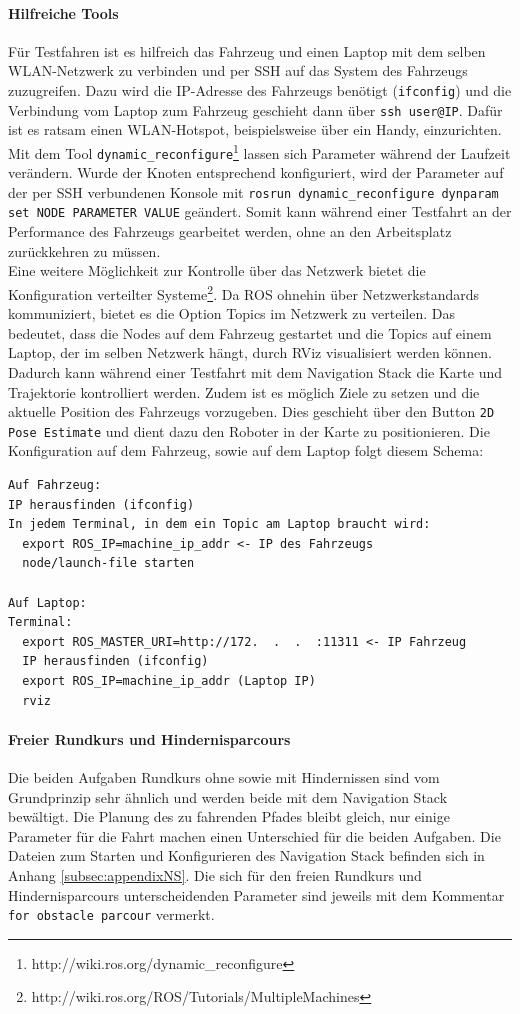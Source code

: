 \paragraph{Hilfreiche Tools}
F\"ur Testfahren ist es hilfreich das Fahrzeug und einen Laptop mit dem selben WLAN-Netzwerk zu verbinden und per SSH auf das System des Fahrzeugs zuzugreifen. Dazu wird die IP-Adresse des Fahrzeugs ben\"otigt (\texttt{ifconfig}) und die Verbindung vom Laptop zum Fahrzeug geschieht dann \"uber \texttt{ssh user@IP}. Daf\"ur ist es ratsam einen WLAN-Hotspot, beispielsweise \"uber ein Handy, einzurichten.\\
Mit dem Tool \texttt{dynamic\_reconfigure}\footnote{http://wiki.ros.org/dynamic\_reconfigure} lassen sich Parameter w\"ahrend der Laufzeit ver\"andern. Wurde der Knoten entsprechend konfiguriert, wird der Parameter auf der per SSH verbundenen Konsole mit \texttt{rosrun dynamic\_reconfigure dynparam set NODE PARAMETER VALUE} ge\"andert. Somit kann w\"ahrend einer Testfahrt an der Performance des Fahrzeugs gearbeitet werden, ohne an den Arbeitsplatz zur\"uckkehren zu m\"ussen.\\
Eine weitere M\"oglichkeit zur Kontrolle \"uber das Netzwerk bietet die Konfiguration verteilter Systeme\footnote{http://wiki.ros.org/ROS/Tutorials/MultipleMachines}. Da ROS ohnehin \"uber Netzwerkstandards kommuniziert, bietet es die Option Topics im Netzwerk zu verteilen. Das bedeutet, dass die Nodes auf dem Fahrzeug gestartet und die Topics auf einem Laptop, der im selben Netzwerk h\"angt, durch RViz visualisiert werden k\"onnen. Dadurch kann w\"ahrend einer Testfahrt mit dem Navigation Stack die Karte und Trajektorie kontrolliert werden. Zudem ist es m\"oglich Ziele zu setzen und die aktuelle Position des Fahrzeugs vorzugeben. Dies geschieht \"uber den Button \texttt{2D Pose Estimate} und dient dazu den Roboter in der Karte zu positionieren. Die Konfiguration auf dem Fahrzeug, sowie auf dem Laptop folgt diesem Schema:
\begin{lstlisting}
Auf Fahrzeug: 
IP herausfinden (ifconfig) 
In jedem Terminal, in dem ein Topic am Laptop braucht wird:  
  export ROS_IP=machine_ip_addr <- IP des Fahrzeugs 
  node/launch-file starten

Auf Laptop: 
Terminal: 
  export ROS_MASTER_URI=http://172.  .  .  :11311 <- IP Fahrzeug
  IP herausfinden (ifconfig) 
  export ROS_IP=machine_ip_addr (Laptop IP) 
  rviz
\end{lstlisting}

\paragraph{Freier Rundkurs und Hindernisparcours}
Die beiden Aufgaben Rundkurs ohne sowie mit Hindernissen sind vom Grundprinzip sehr \"ahnlich und werden beide mit dem Navigation Stack bew\"altigt. Die Planung des zu fahrenden Pfades bleibt gleich, nur einige Parameter f\"ur die Fahrt machen einen Unterschied f\"ur die beiden Aufgaben. Die Dateien zum Starten und Konfigurieren des Navigation Stack befinden sich in Anhang \ref{subsec:appendixNS}. Die sich f\"ur den freien Rundkurs und Hindernisparcours unterscheidenden Parameter sind jeweils mit dem Kommentar \texttt{for obstacle parcour} vermerkt.

